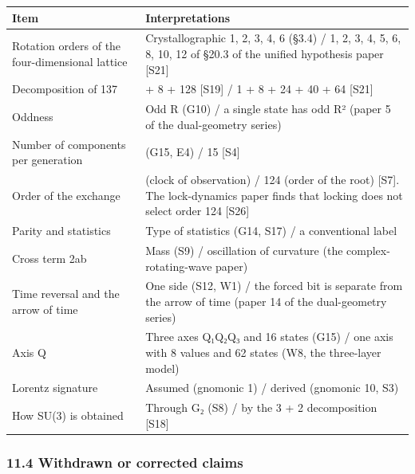 \documentclass[
  a4paper,
]{article}
\newcounter{none} %
\begin{document}
{\def\LTcaptype{none} %
\begin{longtable}[]{@{}
  >{\raggedright\arraybackslash}p{}
  >{\raggedright\arraybackslash}p{}@{}}
\toprule\noalign{}
\begin{minipage}[b]{\linewidth}\raggedright
Item
\end{minipage} & \begin{minipage}[b]{\linewidth}\raggedright
Interpretations
\end{minipage} \\
\midrule\noalign{}
\endhead
\bottomrule\noalign{}
\endlastfoot
Rotation orders of the four-dimensional lattice & Crystallographic 1, 2,
3, 4, 6 (§3.4) / 1, 2, 3, 4, 5, 6, 8, 10, 12 of §20.3 of the unified
hypothesis paper {[}S21{]} \\
Decomposition of 137 & 1 + 8 + 128 {[}S19{]} / 1 + 8 + 24 + 40 + 64
{[}S21{]} \\
Oddness & Odd R (G10) / a single state has odd R² (paper 5 of the
dual-geometry series) \\
Number of components per generation & 16 (G15, E4) / 15 {[}S4{]} \\
Order of the exchange & 248 (clock of observation) / 124 (order of the
root) {[}S7{]}. The lock-dynamics paper finds that locking does not
select order 124 {[}S26{]} \\
Parity and statistics & Type of statistics (G14, S17) / a conventional
label \\
Cross term 2ab & Mass (S9) / oscillation of curvature (the
complex-rotating-wave paper) \\
Time reversal and the arrow of time & One side (S12, W1) / the forced
bit is separate from the arrow of time (paper 14 of the dual-geometry
series) \\
Axis Q & Three axes Q₁Q₂Q₃ and 16 states (G15) / one axis with 8 values
and 62 states (W8, the three-layer model) \\
Lorentz signature & Assumed (gnomonic 1) / derived (gnomonic 10, S3) \\
How SU(3) is obtained & Through G₂ (S8) / by the 3 + 2 decomposition
{[}S18{]} \\
\end{longtable}
}

\subsubsection{11.4 Withdrawn or corrected
claims}\label{withdrawn-or-corrected-claims}
\end{document}
